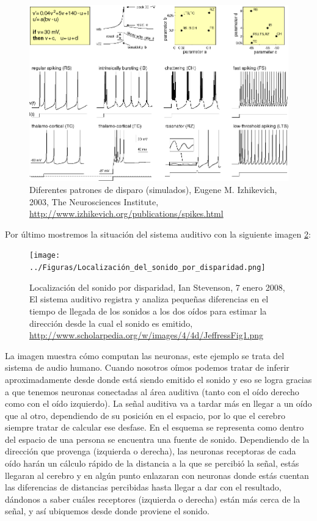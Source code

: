 \begin{figure}[h]
 \centering
 \includegraphics[scale=0.5]{../Figuras/Simple_Model_of_Spiking_Neurons.png}
 \caption{Diferentes patrones de disparo (simulados), Eugene M. Izhikevich, 2003, The Neurosciences Institute, \url{http://www.izhikevich.org/publications/spikes.html}}
 \label{fig:simpleModel}
\end{figure}

Por último mostremos la situación del sistema auditivo con la siguiente imagen \ref{fig:sonidoDisp}:

\begin{figure}[H]
 \centering
 \texttt{[image: ../Figuras/Localización\_del\_sonido\_por\_disparidad.png]}
 \caption{Localización del sonido por disparidad, Ian Stevenson, 7 enero 2008, El sistema auditivo registra y analiza pequeñas diferencias en el tiempo de llegada de los sonidos a los dos oídos para estimar la dirección desde la cual el sonido es emitido, \url{http://www.scholarpedia.org/w/images/4/4d/JeffressFig1.png}}
 \label{fig:sonidoDisp}
\end{figure}

La imagen muestra cómo computan las neuronas, este ejemplo se trata del sistema de audio humano. Cuando nosotros oímos podemos tratar de inferir aproximadamente desde donde está siendo emitido el sonido y eso se logra gracias a que tenemos neuronas conectadas al área auditiva (tanto con el oído derecho como con el oído izquierdo). La señal auditiva va a tardar más en llegar a un oído que al otro, dependiendo de su posición en el espacio, por lo que el cerebro siempre tratar de calcular ese desfase.  
En el esquema se representa como dentro del espacio de una persona se encuentra una fuente de sonido. Dependiendo de la dirección que provenga (izquierda o derecha), las neuronas receptoras de cada oído harán un cálculo rápido de la distancia a la que se percibió la señal, estás llegaran al cerebro y en algún punto enlazaran con neuronas donde estás cuentan las diferencias de distancias percibidas hasta llegar a dar con el resultado, dándonos a saber cuáles receptores (izquierda o derecha) están más cerca de la señal, y así ubiquemos desde donde proviene el sonido.



